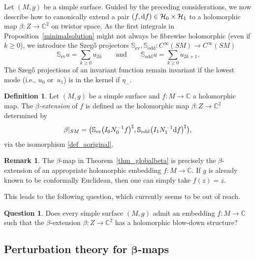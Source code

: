 \documentclass[pdftex]{sigma}
\numberwithin{equation}{section}
\theoremstyle{definition}
\newtheorem{Definition}[Theorem]{Definition}
\newtheorem{Remark}[Theorem]{Remark}
\newtheorem{Question}[Theorem]{Question}
\newcommand{\C}{\mathbb{C}} %
\newcommand{\ev}{\mathrm{ev}}
\newcommand{\1}{{\bf 1}}
\begin{document}
Let $(M,g)$ be a simple surface. Guided by the preceding considerations, we now describe how to canonically extend a pair $(f,{\rm d}f)\in \mathcal H_0\times \mathcal H_1$ to a holomorphic map $\beta\colon Z\rightarrow \C^2$ on twistor space. As the first integrals in Proposition~\ref{minimalsolution} might not always be fibrewise holomorphic (even if $k\ge 0$), we introduce the Szeg\H{o} projectors $\mathbb S_{\ev},\mathbb S_{\mathrm{odd}}\colon C^\infty(SM)\rightarrow C^\infty(SM)$
\[
\mathbb S_{\ev}u=\sum_{k\ge 0} u_{2k}\qquad \text{and} \qquad \mathbb S_{\mathrm{odd}} u = \sum_{k\ge 0} u_{2k+1}.
\]
The Szeg\H{o} projections of an invariant function remain invariant if the lowest mode (i.e., $u_0$ or~$u_1$) is in the kernel if $\eta_-$.

\begin{Definition}\label{def_betaextension}
 Let $(M,g)$ be a simple surface and $f\colon M\rightarrow \C$ a holomorphic map. The {\it $\beta$-extension} of $f$ is defined as the holomorphic map $\beta\colon Z \rightarrow \C^2$ determined by
 \[
 	\beta|_{SM} = \bigl(\mathbb S_{\ev} \bigl(I_0N_0^{-1} f \bigr)^\sharp, \mathbb S_{\mathrm{odd}} \bigl(I_1N_1^{-1}{\rm d}f\bigr)^{\sharp}\bigr),
 \]
via the isomorphism \eqref{def_aoriginal}.
\end{Definition}



\begin{Remark}\label{rmkonglobbeta}
The $\beta$-map in Theorem~\ref{thm_globalbeta} is precisely the $\beta$-extension of an appropriate holomorphic embedding $f\colon M\rightarrow \C$. If $g$ is already known to be conformally Euclidean, then one can simply take $f(z)=z$.
\end{Remark}

This leads to the following question, which currently seems to be out of reach.

\begin{Question}\label{questionsimplebds}
	Does every simple surface $(M,g)$ admit an embedding $f\colon M\rightarrow \C$ such that the $\beta$-extension $\beta\colon Z\rightarrow \C^2$ has a holomorphic blow-down structure?
\end{Question}

\subsection[Perturbation theory for beta-maps]{Perturbation theory for $\boldsymbol{\beta}$-maps}\label{s_perturbationtheory}
\end{document}

